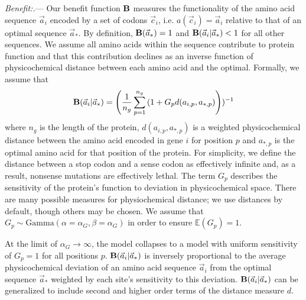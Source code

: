 \documentclass[12pt,letterpaper]{article}
\renewcommand{\subsubsection}[1]{%
\vspace{2ex}
\noindent
\textit{#1.}---}
\newcommand{\EE}{\mathbb{E}} %
\newcommand{\Funcaoptvec}{\ensuremath{\Func(\aoptvec)}\xspace}
\newcommand{\Funcaveci}{\ensuremath{\Func(\aveci|\aoptvec)}\xspace}
\newcommand{\Func}{\ensuremath{\text{\textbf{B}}}\xspace}
\newcommand{\aip}{\ensuremath{a_{i,p}}\xspace}
\newcommand{\alphag}{\ensuremath{\alpha_G}\xspace}
\newcommand{\aoptp}{\ensuremath{a_{*,p}}\xspace}
\newcommand{\aoptvec}{\ensuremath{\Vec{a}_*}\xspace}
\newcommand{\aveci}{\ensuremath{\Vec{a}_i}\xspace}
\newcommand{\cveci}{\ensuremath{\cvec_i}\xspace}
\newcommand{\cvec}{\ensuremath{\Vec{c}}\xspace}
\renewcommand{\ng}{\ensuremath{{n_g}}\xspace}
\newcommand{\gp}{\ensuremath{{G_p}}\xspace}
\begin{document}
\subsubsection{Benefit:}
Our benefit function \Func measures the functionality of the amino acid sequence \aveci encoded by a set of codons \cveci, i.e. $a(\cveci) = \aveci$ relative to that of an optimal sequence $\aoptvec$.
By definition, $\Funcaoptvec = 1$ and $\Funcaveci < 1$ for all other sequences.
We assume all amino acids within the sequence contribute to protein function and that this contribution declines as an inverse function of physicochemical distance between each amino acid and the optimal.
Formally, we assume that
\begin{equation}
\Funcaveci = \left(\frac{1}{\ng} \sum_{p=1}^\ng \left(1 + \gp d(\aip, \aoptp\right)\right))^{-1}
\end{equation}
where $\ng$ is the length of the protein, $d(\aip, \aoptp)$ is a weighted physicochemical distance between the amino acid encoded in gene $i$ for position $p$ and $\aoptp$ is the optimal amino acid for that position of the protein.
For simplicity, we define the distance between a stop codon and a sense codon as effectively infinite and, as a result, nonsense mutations are effectively lethal.
The term \gp describes the sensitivity of the protein's function to deviation in physicochemical space.
There are many possible measures for physiochemical distance; we use \citep{Grantham1974} distances by default, though others may be chosen.
We assume that $\gp \sim \text{Gamma}\left(\alpha = \alphag, \beta = \alphag\right)$ in order to ensure $\EE(\gp) = 1$.

At the limit of $\alphag \rightarrow \infty$, the model collapses to a model with uniform sensitivity of $\gp = 1$ for all positions $p$.
\Funcaveci is inversely proportional to the average physicochemical deviation of an amino acid sequence \aveci from the optimal sequence \aoptvec weighted by each site's sensitivity to this deviation.
\Funcaveci can be generalized to include second and higher order terms of the distance measure $d$.
\end{document}
